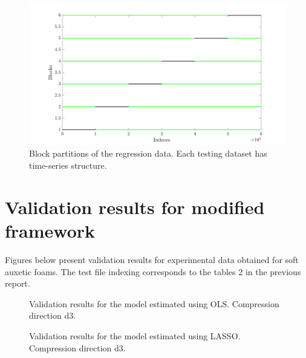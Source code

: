\documentclass[a4paper,11pt,twoside]{article}
\theoremstyle{mytheoremstyle}
\begin{document}
\begin{figure}[!h]
	\includegraphics[width=\linewidth]{blocks.png}
	\caption{Block partitions of the regression data. Each testing dataset has time-series structure.}
\end{figure}
\section{Validation results for modified framework}
\par Figures below present validation results for experimental data obtained for soft auxetic foams. The test file indexing corresponds to the tables 2 in the previous report.
%	
%	
\begin{figure}[!h]
	\centering
	
	\caption{Validation results for the model estimated using OLS. Compression direction d3.}\label{fig:spgl_hs}
\end{figure}
\begin{figure}[!h]
	\centering
	
	\caption{Validation results for the model estimated using LASSO. Compression direction d3.}\label{fig:spgl_vs}
\end{figure}
\end{document}
